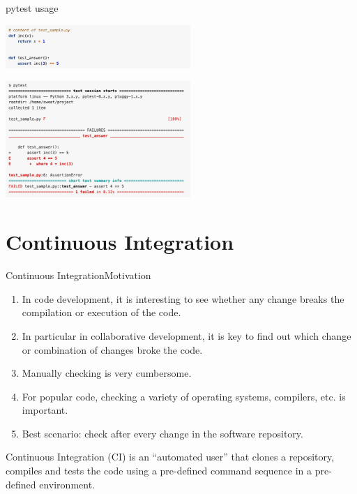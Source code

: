 \documentclass{setbeamer}
\begin{document}
\begin{frame}{pytest usage}
        

\includegraphics[width=7cm]{resources/pytest1.png}
   
\vspace{.3cm}


\includegraphics[width=7cm]{resources/pytest2.png} 


\end{frame}


\section{Continuous Integration}

\begin{frame}{Continuous Integration}{Motivation}
    \begin{enumerate}
        \item In code development, it is interesting to see whether any change breaks the compilation or execution of the code.
        \item In particular in collaborative development, it is key to find out which change or combination of changes broke the code.
        \item Manually checking is very cumbersome.
        \item For popular code, checking a variety of operating systems, compilers, etc. is important.
        \item Best scenario: check after every change in the software repository.
    \end{enumerate}

\vspace{1cm}

Continuous Integration (CI) is an ``automated user'' that clones a repository, compiles and tests the code using a pre-defined command sequence in a pre-defined environment.   
    
\end{frame}
\end{document}
